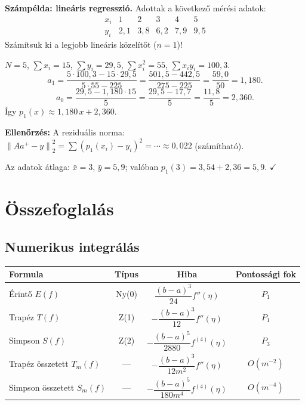 \documentclass[a4paper,12pt]{article}
\theoremstyle{mydef}
\newcommand{\norm}[1]{\left\|#1\right\|}
\begin{document}
\begin{mdframed}[backgroundcolor=exbg,linewidth=0pt,innertopmargin=8pt,innerbottommargin=8pt]
\textbf{Számpélda: lineáris regresszió.}
Adottak a következő mérési adatok:
\[
\begin{array}{c|ccccc}
x_i & 1 & 2 & 3 & 4 & 5 \\\hline
y_i & 2{,}1 & 3{,}8 & 6{,}2 & 7{,}9 & 9{,}5
\end{array}
\]
Számítsuk ki a legjobb lineáris közelítőt ($n=1$)!

$N = 5$, $\sum x_i = 15$, $\sum y_i = 29{,}5$, $\sum x_i^2 = 55$, $\sum x_i y_i = 100{,}3$.
\[
  a_1 = \frac{5 \cdot 100{,}3 - 15 \cdot 29{,}5}{5 \cdot 55 - 225}
  = \frac{501{,}5 - 442{,}5}{275 - 225} = \frac{59{,}0}{50} = 1{,}180.
\]
\[
  a_0 = \frac{29{,}5 - 1{,}180 \cdot 15}{5} = \frac{29{,}5 - 17{,}7}{5} = \frac{11{,}8}{5} = 2{,}360.
\]
Így $p_1(x) \approx 1{,}180\,x + 2{,}360$.

\textbf{Ellenőrzés:} A reziduális norma:
$\norm{Aa^+ - y}_2^2 = \sum (p_1(x_i)-y_i)^2 = \cdots \approx 0{,}022$ (számítható).

Az adatok átlaga: $\bar{x} = 3$, $\bar{y} = 5{,}9$; valóban $p_1(3) = 3{,}54 + 2{,}36 = 5{,}9$. $\checkmark$
\end{mdframed}

\section*{Összefoglalás}

\subsection*{Numerikus integrálás}

\begin{center}
\renewcommand{\arraystretch}{1.5}
\begin{tabular}{l|c|c|c}
\toprule
\textbf{Formula} & \textbf{Típus} & \textbf{Hiba} & \textbf{Pontossági fok}\\
\midrule
Érintő $E(f)$ & Ny(0) & $\dfrac{(b-a)^3}{24}f''(\eta)$ & $P_1$ \\
Trapéz $T(f)$ & Z(1) & $-\dfrac{(b-a)^3}{12}f''(\eta)$ & $P_1$ \\
Simpson $S(f)$ & Z(2) & $-\dfrac{(b-a)^5}{2880}f^{(4)}(\eta)$ & $P_3$ \\[4pt]
\midrule
Trapéz összetett $T_m(f)$ & — & $-\dfrac{(b-a)^3}{12m^2}f''(\eta)$ & $O(m^{-2})$ \\
Simpson összetett $S_m(f)$ & — & $-\dfrac{(b-a)^5}{180m^4}f^{(4)}(\eta)$ & $O(m^{-4})$ \\
\bottomrule
\end{tabular}
\end{center}
\end{document}
